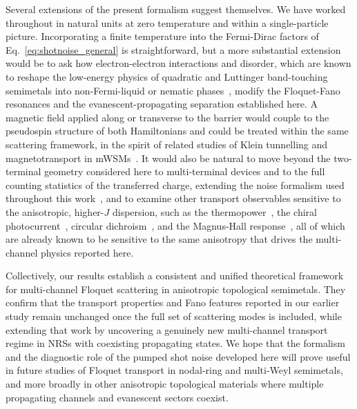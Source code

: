 \documentclass[aps,prb,onecolumn,longbibliography,nofootinbib,citeautoscript,10pt]{revtex4-2}
\begin{document}
Several extensions of the present formalism suggest themselves. We have worked throughout in natural units at zero temperature and within a single-particle picture. Incorporating a finite temperature into the Fermi-Dirac factors of Eq.~\eqref{eq:shotnoise_general} is straightforward, but a more substantial extension would be to ask how electron-electron interactions and disorder, which are known to reshape the low-energy physics of quadratic and Luttinger band-touching semimetals into non-Fermi-liquid or nematic phases~\cite{Sun09,  ips-seb, cho16, ips-hermann-review}, modify the Floquet-Fano resonances and the evanescent-propagating separation established here. A magnetic field applied along or transverse to the barrier would couple to the pseudospin structure of both Hamiltonians and could be treated within the same scattering framework, in the spirit of related studies of Klein tunnelling and magnetotransport in mWSMs~\cite{mansoor, rahul-jpcm, ips-ruiz, ips-cjp, ips-tilted, ipsita-shivam}. It would also be natural to move beyond the two-terminal geometry considered here to multi-terminal devices and to the full counting statistics of the transferred charge, extending the noise formalism used throughout this work~\cite{avron01, kamenev00},  and to examine other transport observables sensitive to the anisotropic, higher-$J$ dispersion, such as the thermopower~\cite{ips-kush, lundgren2014thermo, ips-kush-review}, the chiral photocurrent~\cite{ips-photocurrent, kozii}, circular dichroism~\cite{sajid-cd, ips_cd}, and the Magnus-Hall response~\cite{sajid_magnus22},  all of which are already known to be sensitive to the same anisotropy that drives the multi-channel physics reported here.

Collectively, our results establish a consistent and unified theoretical framework for multi-channel Floquet scattering in anisotropic topological semimetals. They confirm that the transport properties and Fano features reported in our earlier study remain unchanged once the full set of scattering modes is included, while extending that work by uncovering a genuinely new multi-channel transport regime in NRSs with coexisting propagating states. We hope that the formalism and the diagnostic role of the pumped shot noise developed here will prove useful in future studies of Floquet transport in nodal-ring and multi-Weyl semimetals, and more broadly in other anisotropic topological materials where multiple propagating channels and evanescent sectors coexist.

\appendix
\end{document}
